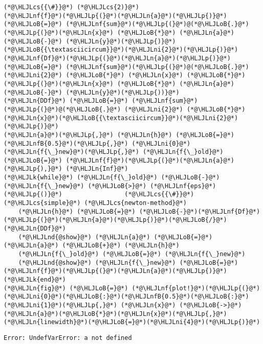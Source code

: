 \documentclass[12pt,a4paper]{article}
\newcommand{\HLJLk}[1]{\textcolor[RGB]{148,91,176}{\textbf{#1}}}
\newcommand{\HLJLn}[1]{#1}
\newcommand{\HLJLnd}[1]{\textcolor[RGB]{214,102,97}{#1}}
\newcommand{\HLJLnf}[1]{\textcolor[RGB]{66,102,213}{#1}}
\newcommand{\HLJLnfB}[1]{\textcolor[RGB]{59,151,46}{#1}}
\newcommand{\HLJLni}[1]{\textcolor[RGB]{59,151,46}{#1}}
\newcommand{\HLJLoB}[1]{\textcolor[RGB]{102,102,102}{\textbf{#1}}}
\newcommand{\HLJLp}[1]{#1}
\newcommand{\HLJLcs}[1]{\textcolor[RGB]{153,153,119}{\textit{#1}}}
\begin{document}
\begin{lstlisting}
(*@\HLJLcs{{\#}}@*) (*@\HLJLcs{2)}@*)
(*@\HLJLnf{f}@*)(*@\HLJLp{(}@*)(*@\HLJLn{a}@*)(*@\HLJLp{)}@*) (*@\HLJLoB{=}@*) (*@\HLJLnf{sum}@*)(*@\HLJLp{(}@*)@(*@\HLJLoB{.}@*) (*@\HLJLp{(}@*)(*@\HLJLn{x}@*) (*@\HLJLoB{*}@*) (*@\HLJLn{a}@*) (*@\HLJLoB{-}@*) (*@\HLJLn{y}@*)(*@\HLJLp{)}@*)(*@\HLJLoB{{\textasciicircum}}@*)(*@\HLJLni{2}@*)(*@\HLJLp{)}@*)
(*@\HLJLnf{Df}@*)(*@\HLJLp{(}@*)(*@\HLJLn{a}@*)(*@\HLJLp{)}@*) (*@\HLJLoB{=}@*) (*@\HLJLnf{sum}@*)(*@\HLJLp{(}@*)@(*@\HLJLoB{.}@*) (*@\HLJLni{2}@*) (*@\HLJLoB{*}@*) (*@\HLJLn{x}@*) (*@\HLJLoB{*}@*) (*@\HLJLp{(}@*)(*@\HLJLn{x}@*) (*@\HLJLoB{*}@*) (*@\HLJLn{a}@*) (*@\HLJLoB{-}@*) (*@\HLJLn{y}@*)(*@\HLJLp{))}@*)
(*@\HLJLn{DDf}@*) (*@\HLJLoB{=}@*) (*@\HLJLnf{sum}@*)(*@\HLJLp{(}@*)@(*@\HLJLoB{.}@*) (*@\HLJLni{2}@*) (*@\HLJLoB{*}@*) (*@\HLJLn{x}@*)(*@\HLJLoB{{\textasciicircum}}@*)(*@\HLJLni{2}@*)(*@\HLJLp{)}@*)
(*@\HLJLn{a}@*)(*@\HLJLp{,}@*) (*@\HLJLn{h}@*) (*@\HLJLoB{=}@*) (*@\HLJLnfB{0.5}@*)(*@\HLJLp{,}@*) (*@\HLJLni{0}@*)
(*@\HLJLn{f{\_}new}@*)(*@\HLJLp{,}@*) (*@\HLJLn{f{\_}old}@*) (*@\HLJLoB{=}@*) (*@\HLJLnf{f}@*)(*@\HLJLp{(}@*)(*@\HLJLn{a}@*)(*@\HLJLp{),}@*) (*@\HLJLn{Inf}@*)
(*@\HLJLk{while}@*) (*@\HLJLn{f{\_}old}@*) (*@\HLJLoB{-}@*) (*@\HLJLn{f{\_}new}@*) (*@\HLJLoB{>}@*) (*@\HLJLnf{eps}@*)(*@\HLJLp{()}@*)                 (*@\HLJLcs{{\#}}@*) (*@\HLJLcs{simple}@*) (*@\HLJLcs{newton-method}@*)
    (*@\HLJLn{h}@*) (*@\HLJLoB{=}@*) (*@\HLJLoB{-}@*)(*@\HLJLnf{Df}@*)(*@\HLJLp{(}@*)(*@\HLJLn{a}@*)(*@\HLJLp{)}@*)(*@\HLJLoB{/}@*)(*@\HLJLn{DDf}@*)                      
    (*@\HLJLnd{@show}@*) (*@\HLJLn{a}@*) (*@\HLJLoB{=}@*) (*@\HLJLn{a}@*) (*@\HLJLoB{+}@*) (*@\HLJLn{h}@*)
    (*@\HLJLn{f{\_}old}@*) (*@\HLJLoB{=}@*) (*@\HLJLn{f{\_}new}@*)
    (*@\HLJLnd{@show}@*) (*@\HLJLn{f{\_}new}@*) (*@\HLJLoB{=}@*) (*@\HLJLnf{f}@*)(*@\HLJLp{(}@*)(*@\HLJLn{a}@*)(*@\HLJLp{)}@*)
(*@\HLJLk{end}@*)
(*@\HLJLn{fig}@*) (*@\HLJLoB{=}@*) (*@\HLJLnf{plot!}@*)(*@\HLJLp{(}@*)(*@\HLJLni{0}@*)(*@\HLJLoB{:}@*)(*@\HLJLnfB{0.5}@*)(*@\HLJLoB{:}@*)(*@\HLJLni{1}@*)(*@\HLJLp{,}@*) (*@\HLJLn{x}@*) (*@\HLJLoB{->}@*) (*@\HLJLn{a}@*)(*@\HLJLoB{*}@*)(*@\HLJLn{x}@*)(*@\HLJLp{,}@*) (*@\HLJLn{linewidth}@*)(*@\HLJLoB{=}@*)(*@\HLJLni{4}@*)(*@\HLJLp{)}@*)
\end{lstlisting}

\begin{lstlisting}
Error: UndefVarError: a not defined
\end{lstlisting}
\end{document}
